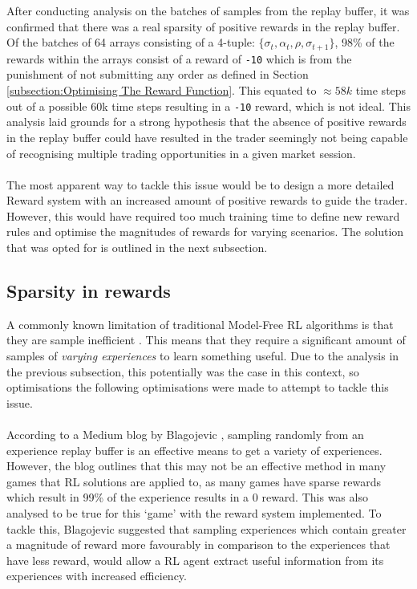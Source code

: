 \documentclass[ %
                    author={Ashwinder Khurana},
                supervisor={Prof Dave Cliff},
                    degree={MEng},
                     title={The Deeply Reinforced Trader},
                  subtitle={},
                      type={enterprise},
                      year={2020} ]{dissertation}
\begin{document}
{\\
\\
After conducting analysis on the batches of samples from the replay buffer, it was confirmed that there was a real sparsity of positive rewards in the replay buffer. Of the batches of 64 arrays consisting of a 4-tuple: $\{\sigma_t, \alpha_t, \rho, \sigma_{t+1}\}$, 98\% of the rewards within the arrays consist of a reward of \texttt{-10} which is from the punishment of not submitting any order as defined in Section \ref{subsection:Optimising The Reward Function}. This equated to $\approx58k$ time steps out of a possible 60k time steps resulting in a \texttt{-10} reward, which is not ideal. This analysis laid grounds for a strong hypothesis that the absence of positive rewards in the replay buffer could have resulted in the trader seemingly not being capable of recognising multiple trading opportunities in a given market session. 
\\
\\
The most apparent way to tackle this issue would be to design a more detailed Reward system with an increased amount of positive rewards to guide the trader. However, this would have required too much training time to define new reward rules and optimise the magnitudes of rewards for varying scenarios. The solution that was opted for is outlined in the next subsection. 


\subsection{Sparsity in rewards}
A commonly known limitation of traditional Model-Free RL algorithms is that they are sample inefficient \cite{sample-inefficient}. This means that they require a significant amount of samples of \textit{varying experiences} to learn something useful. Due to the analysis in the previous subsection, this potentially was the case in this context, so optimisations the following optimisations were made to attempt to tackle this issue.
\\
\\
\noindent
According to a Medium blog by Blagojevic \cite{sample-solution}, sampling randomly from an experience replay buffer is an effective means to get a variety of experiences. However, the blog outlines that this may not be an effective method in many games that RL solutions are applied to, as many games have sparse rewards which result in 99\% of the experience results in a 0 reward. This was also analysed to be true for this \enquote*{game} with the reward system implemented. To tackle this, Blagojevic suggested that sampling experiences which contain greater a magnitude of reward more favourably in comparison to the experiences that have less reward, would allow a RL agent extract useful information from its experiences with increased efficiency.

}
\end{document}
